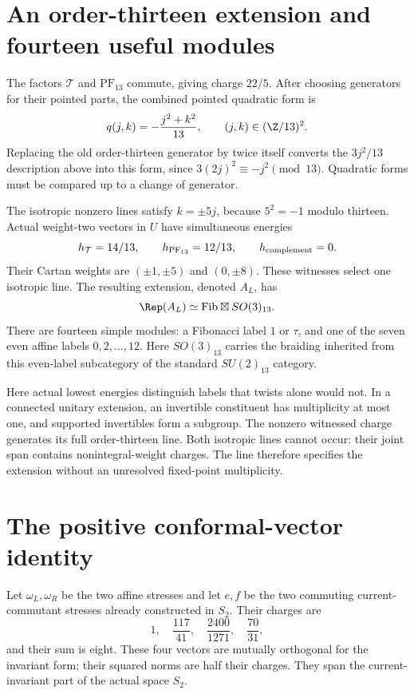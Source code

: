 \section{An order-thirteen extension and fourteen useful modules}

The factors $\mathcal T$ and $\mathrm{PF}_{13}$ commute, giving
charge $22/5$. After choosing generators for their pointed parts, the
combined pointed quadratic form is
\[
 q(j,k)=-\frac{j^2+k^2}{13},\qquad(j,k)\in(\Z/13)^2.
\]
Replacing the old order-thirteen generator by twice itself converts the
$3j^2/13$ description above into this form, since
$3(2j)^2\equiv-j^2\pmod{13}$. Quadratic forms must be compared
up to a change of generator.

The isotropic nonzero lines satisfy $k=\pm5j$, because $5^2=-1$
modulo thirteen. Actual weight-two vectors in $U$ have simultaneous
energies
\[
 h_{\mathcal T}=14/13,\qquad h_{\mathrm{PF}_{13}}=12/13,
 \qquad h_{\rm complement}=0.
\]
Their Cartan weights are $(\pm1,\pm5)$ and $(0,\pm8)$.
These witnesses select one isotropic line. The resulting extension,
denoted $A_L$, has
\begin{equation}\label{eq:c-core-category}
 \Rep(A_L)\simeq\mathrm{Fib}\boxtimes SO(3)_{13}.
\end{equation}
There are fourteen simple modules: a Fibonacci label $1$ or $\tau$,
and one of the seven even affine labels $0,2,\ldots,12$.
Here $SO(3)_{13}$ carries the braiding inherited from this even-label
subcategory of the standard $SU(2)_{13}$ category.

Here actual lowest energies distinguish labels that twists alone would
not. In a connected unitary extension, an invertible constituent has
multiplicity at most one, and supported invertibles form a subgroup.
The nonzero witnessed charge generates its full order-thirteen line.
Both isotropic lines cannot occur: their joint span contains
nonintegral-weight charges. The line therefore specifies the extension
without an unresolved fixed-point multiplicity.

\section{The positive conformal-vector identity}

Let $\omega_L,\omega_R$ be the two affine stresses and let $e,f$ be
the two commuting current-commutant stresses already constructed in
$S_2$. Their charges are
\[
 1,\quad\frac{117}{41},\quad
 \frac{2400}{1271},\quad\frac{70}{31},
\]
and their sum is eight. These four vectors are mutually orthogonal
for the invariant form; their squared norms are half their charges.
They span the current-invariant part of the actual space $S_2$.

